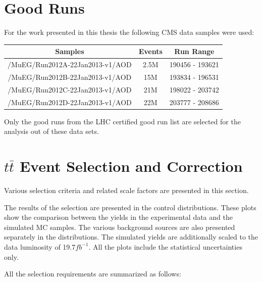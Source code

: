 \section{Good Runs}

For the work presented in this thesis the following CMS data samples were used:

\begin{center}\label{tab:samples}
  \begin{tabular}{| c c c |}
    \hline
    \textbf{Samples} & \textbf{Events} & \textbf{Run Range} \\ \hline
    /MuEG/Run2012A-22Jan2013-v1/AOD & 2.5M & 190456 - 193621 \\ 
    /MuEG/Run2012B-22Jan2013-v1/AOD & 15M & 193834 - 196531 \\
    /MuEG/Run2012C-22Jan2013-v1/AOD & 21M & 198022 - 203742 \\
    /MuEG/Run2012D-22Jan2013-v1/AOD & 22M & 203777 -  208686 \\
    \hline
  \end{tabular}
\end{center}

Only the good runs from the LHC certified good run list\cite{JSON} are selected for the analysis out of these data sets.

\section{$t\bar{t}$ Event Selection and Correction}\label{sec:sel}

Various selection criteria and related scale factors are presented in this section.

The results of the selection are presented in the control distributions. These plots show the comparison between the yields in the experimental data and the simulated MC samples.
The various background sources are also presented separately in the distributions. The simulated yields are additionally scaled to the data luminosity of 19.7\;$fb^{-1}$.
All the plots include the statistical uncertainties only.

All the selection requirements are summarized as follows:

